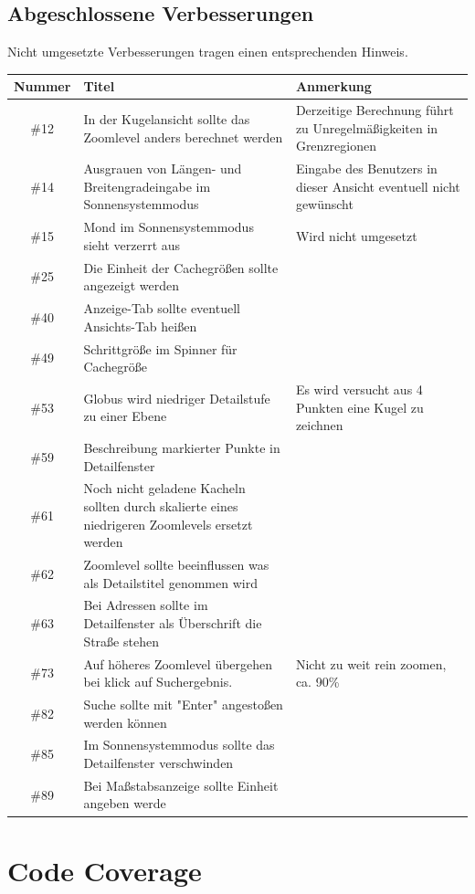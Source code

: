 \documentclass[10pt]{scrreprt}
\begin{document}
\section{Abgeschlossene Verbesserungen}
Nicht umgesetzte Verbesserungen tragen einen entsprechenden Hinweis.
\begin{longtable}{|c|p{5.2cm}|p{8.2cm}|}
\hline
Nummer & Titel & Anmerkung \\
\hline
\hline
\#12 & In der Kugelansicht sollte das Zoomlevel anders berechnet werden & Derzeitige Berechnung führt zu Unregelmäßigkeiten in Grenzregionen \\
\hline
\#14 & Ausgrauen von Längen- und Breitengradeingabe im Sonnensystemmodus & Eingabe des Benutzers in dieser Ansicht eventuell nicht gewünscht \\
\hline
\#15 & Mond im Sonnensystemmodus sieht verzerrt aus & Wird nicht umgesetzt \\
\hline
\#25 & Die Einheit der Cachegrößen sollte angezeigt werden & \\ 
\hline
\#40 & Anzeige-Tab sollte eventuell Ansichts-Tab heißen & \\
\hline
\#49 & Schrittgröße im Spinner für Cachegröße & \\
\hline
\#53 & Globus wird niedriger Detailstufe zu einer Ebene & Es wird versucht aus 4 Punkten eine Kugel zu zeichnen \\
\hline
\#59 & Beschreibung markierter Punkte in Detailfenster \\
\hline
\#61 & Noch nicht geladene Kacheln sollten durch skalierte eines niedrigeren Zoomlevels ersetzt werden \\
\#62 & Zoomlevel sollte beeinflussen was als Detailstitel genommen wird \\
\hline
\#63 & Bei Adressen sollte im Detailfenster als Überschrift die Straße stehen \\
\hline
\#73 & Auf höheres Zoomlevel übergehen bei klick auf Suchergebnis. & Nicht zu weit rein zoomen, ca. 90\% \\
\hline
\#82 & Suche sollte mit "Enter" angestoßen werden können & \\
\hline
\#85 & Im Sonnensystemmodus sollte das Detailfenster verschwinden & \\
\hline
\#89 & Bei Maßstabsanzeige sollte Einheit angeben werde & \\
\hline
\end{longtable}

\chapter{Code Coverage}
\end{document}
